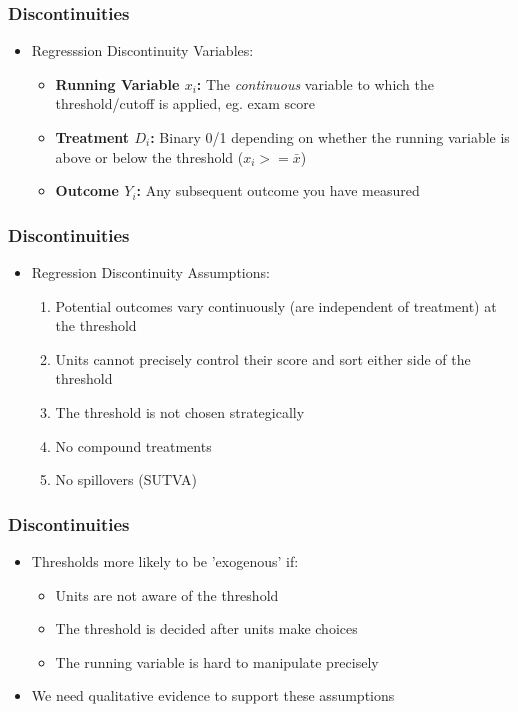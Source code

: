 \documentclass[xcolor=x11names,compress]{beamer}\usepackage[]{graphicx}\usepackage[]{color}
\renewcommand{\(}{\begin{columns}}
\renewcommand{\)}{\end{columns}}
\newcommand{\<}[1]{\begin{column}{#1}}
\renewcommand{\>}{\end{column}}
\begin{document}
\begin{frame}
\frametitle{Discontinuities}
\begin{itemize}
\item Regresssion Discontinuity Variables:
\begin{itemize}
\item \textbf{Running Variable $x_i$:} The \textit{continuous} variable to which the threshold/cutoff is applied, eg. exam score
\pause
\item \textbf{Treatment $D_i$:} Binary 0/1 depending on whether the running variable is above or below the threshold ($x_i>=\bar{x}$)
\pause
\item \textbf{Outcome $Y_i$:} Any subsequent outcome you have measured
\end{itemize}
\end{itemize}
\end{frame}

\begin{frame}
\frametitle{Discontinuities}
\begin{itemize}
\item Regression Discontinuity Assumptions:
\begin{enumerate}
\item Potential outcomes vary continuously (are independent of treatment) at the threshold
\pause
\item Units cannot precisely control their score and sort either side of the threshold
\pause
\item The threshold is not chosen strategically
\pause
\item No compound treatments
\pause
\item No spillovers (SUTVA)
\end{enumerate}
\end{itemize}
\end{frame}

\begin{frame}
\frametitle{Discontinuities}
\begin{itemize}
\item Thresholds more likely to be 'exogenous' if:
\pause
\begin{itemize}
\item Units are not aware of the threshold
\pause
\item The threshold is decided after units make choices
\pause
\item The running variable is hard to manipulate precisely
\pause
\end{itemize}
\item We need qualitative evidence to support these assumptions
\end{itemize}
\end{frame}
\end{document}

